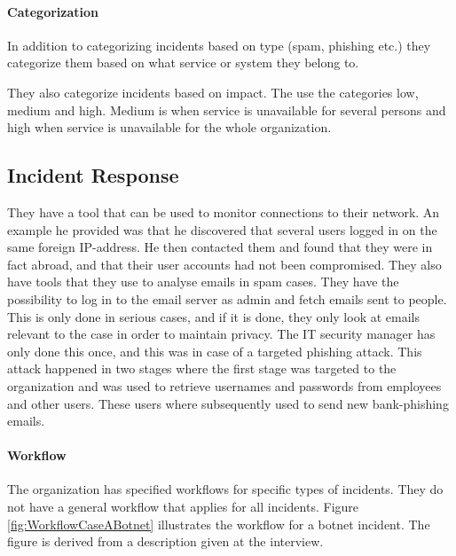 \paragraph{Categorization}
In addition to categorizing incidents based on type (spam, phishing etc.) they categorize them based on what service or system they belong to.

They also categorize incidents based on impact. The use the categories low, medium and high. Medium is when service is unavailable for several persons and high when service is unavailable for the whole organization.

\subsection{Incident Response}
They have a tool that can be used to monitor connections to their network. An example he provided was that he discovered that several users logged in on the same foreign IP-address. He then contacted them and found that they were in fact abroad, and that their user accounts had not been compromised. They also have tools that they use to analyse emails in spam cases. They have the possibility to log in to the email server as admin and fetch emails sent to people. This is only done in serious cases, and if it is done, they only look at emails relevant to the case in order to maintain privacy. The IT security manager has only done this once, and this was in case of a targeted phishing attack. This attack happened in two stages where the first stage was targeted to the organization and was used to retrieve usernames and passwords from employees and other users. These users where subsequently used to send new bank-phishing emails.

\paragraph{Workflow}
The organization has specified workflows for specific types of incidents. They do not have a general workflow that applies for all incidents. Figure \ref{fig:WorkflowCaseABotnet} illustrates the workflow for a botnet incident. The figure is derived from a description given at the interview. 

